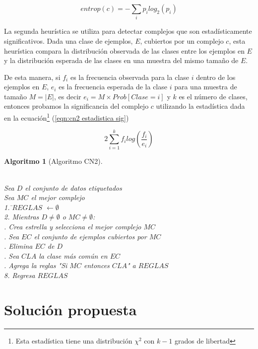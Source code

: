 \documentclass[12pt]{report}
\theoremstyle{break}
\theoremstyle{break}
\newtheorem{algoritmo}{Algoritmo}[chapter]
\begin{document}
\begin{equation} \label{eqn:entropia complejo}
entrop(c) = - \sum_{i} p_i log_{2}(p_{i})
\end{equation}

La segunda heurística se utiliza para detectar complejos que son estadísticamente significativos. Dada una clase de ejemplos, $E$, cubiertos por un complejo $c$, esta heurística compara la distribución observada de las clases entre los ejemplos en $E$ y la distribución esperada de las clases en una muestra del mismo tamaño de $E$.

De esta manera, si $f_i$ es la frecuencia observada para la clase $i$ dentro de los ejemplos en $E$, $e_{i}$ es la frecuencia esperada de la clase $i$ para una muestra de tamaño $M=\vert E \vert$, es decir $e_i = M \times Prob\left[ Clase = i \right]$ y $k$ es el número de clases, entonces probamos la significancia del complejo $c$ utilizando la estadística dada en la ecuación\footnote{Esta estadística tiene una distribución $\chi^2$ con $k-1$ grados de libertad } (\ref{eqn:cn2 estadistica sig})

\begin{equation} \label{eqn:cn2 estadistica sig}
2 \sum_{i=1}^{k} f_{i} log\left(\frac{f_{i}} {e_{i}} \right)
\end{equation}

\begin{algoritmo}[Algoritmo CN2]
\begin{tabbing}
\\Sea $D$ el conjunto de datos etiquetados
\\Sea $MC$ el mejor complejo\\
1. \=$REGLAS$ $\leftarrow \emptyset $ \\
2. Mientras $D \neq \emptyset$ o $MC \neq \emptyset$:\\
 . Crea estrella y selecciona el mejor complejo $MC$\\
 . Sea $EC$ el conjunto de ejemplos cubiertos por $MC$ \\
 . Elimina $EC$ de $D$\\
 . Sea $CLA$ la clase más común en $EC$\\
 . Agrega la reglas "Si $MC$ entonces $CLA$" a $REGLAS$\\
8. Regresa $REGLAS$
\end{tabbing}
\label{algo:CN2}
\end{algoritmo}

\chapter[Capítulo \thechapter: Solución propuesta]{Solución propuesta}
\label{capitulo:solucion propuesta}
\end{document}
